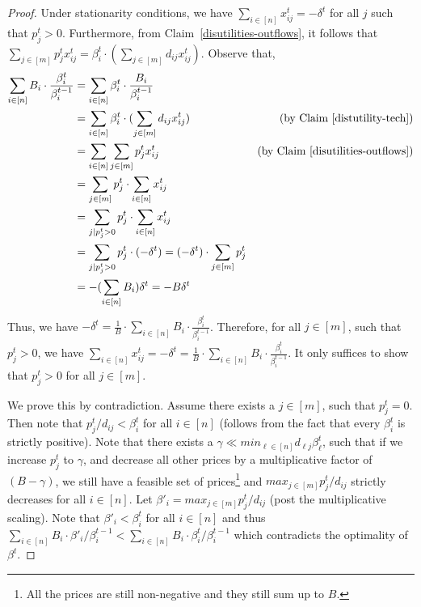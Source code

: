 \documentclass[format=acmsmall,authorversion]{acmart}
\begin{document}
\begin{proof}
    Under stationarity conditions, we have $\sum_{i \in [n]} x^t_{ij} = -\delta^t$ for all $j$ such that $p^t_j > 0$. Furthermore, from Claim~\ref{disutilities-outflows}, it follows that $\sum_{j \in [m]} p^t_j x^t_{ij} = \beta^t_i \cdot (\sum_{j \in [m]} d_{ij} x^t_{ij})$. Observe that,
    \begin{align*}
        \sum_{i \in [n]} B_i \cdot \frac{\beta^t_i}{\beta^{t-1}_i} &=\sum_{i \in [n]} \beta^t_i \cdot \frac{B_i}{\beta^{t-1}_i}\\ 
                                                  &= \sum_{i \in [n]} \beta^t_i \cdot (\sum_{j \in [m]} d_{ij}x^t_{ij})  &\text{(by Claim~\ref{distutility-tech})}\\
                                                  &= \sum_{i \in [n]} \sum_{j \in [m]} p^t_jx^t_{ij} &\text{(by Claim~\ref{disutilities-outflows})}\\
                                                  &= \sum_{j \in [m]} p^t_j \cdot \sum_{i \in [n]} x^t_{ij}\\
                                                      &= \sum_{j \mid p^t_j >0} p^t_j \cdot \sum_{i \in [n]} x^t_{ij}\\
                                                      &=\sum_{j \mid p^t_j >0} p^t_j \cdot (-\delta^t) = (-\delta^t) \cdot \sum_{j \in [m]} p^t_j\\
                                                      &=- (\sum_{i \in [n]} B_i)\delta^t = -B\delta^t
    \end{align*}
    Thus, we have $-\delta^t = \frac{1}{B} \cdot \sum_{i \in [n]} B_i \cdot \frac{\beta^t_i}{\beta^{t-1}_i}$. Therefore, for all $j \in [m]$, such that $p^t_j > 0$, we have $\sum_{i \in [n]} x^t_{ij} = - \delta^t = \frac{1}{B} \cdot \sum_{i \in [n]} B_i \cdot \frac{\beta^t_i}{\beta^{t-1}_i}$. It only suffices to show that $p^t_j > 0$ for all $j \in [m]$.
    
    We prove this by contradiction. Assume there exists a $j \in [m]$, such that $p^t_j = 0$. Then note that $p^t_j/d_{i j} < \beta^t_{i}$ for all $i \in [n]$ (follows from the fact that every $\beta^t_i$ is strictly positive). Note that there exists a $\gamma \ll  \mathit{min}_{\ell \in [n]} d_{\ell j} \beta^t_{\ell}$,  such that if we increase $p^t_j$ to $\gamma$, and decrease all other prices by a multiplicative factor of $(B-\gamma)$, we still have a feasible set of prices\footnote{All the prices are still non-negative and they still sum up to $B$.} and $\mathit{max}_{j \in [m]} p^t_j/d_{ij}$ strictly decreases for all $i \in [n]$. Let $\beta'_i = \mathit{max}_{j \in [m]} p^t_j/d_{ij}$ (post the multiplicative scaling). Note that $\beta'_i < \beta^t_i$ for all $i \in [n]$ and thus $\sum_{i \in [n]} B_i \cdot \beta'_i/\beta^{t-1}_i <\sum_{i\in [n]} B_i \cdot \beta^t_i/\beta^{t-1}_i$ which contradicts the optimality of $\beta^t$. 
\end{proof}
\end{document}
